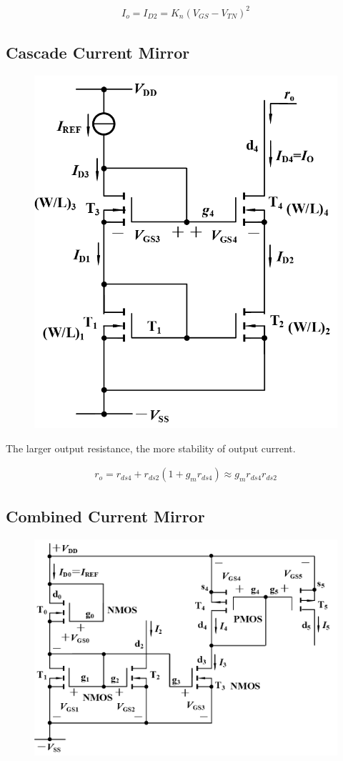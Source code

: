 \begin{equation*}
  \begin{aligned}
    I_o = I_{D2} = K_n \left( V_{GS} - V_{TN} \right)^2
  \end{aligned}
\end{equation*}

\subsection{Cascade Current Mirror}

\begin{figure}[H]
  \centering
  \includegraphics[width=0.5\linewidth]{figures/Cascade-Current-Source}
\end{figure}

The larger output resistance, the more stability of output current.

\begin{equation*}
  \begin{aligned}
    r_o = r_{ds4} + r_{ds2} \left( 1 + g_m r_{ds4} \right) \approx g_m r_{ds4} r_{ds2}
  \end{aligned}
\end{equation*}

\subsection{Combined Current Mirror}

\begin{figure}[H]
  \centering
  \includegraphics[width=0.6\linewidth]{figures/Combined-Current-Source}
\end{figure}

